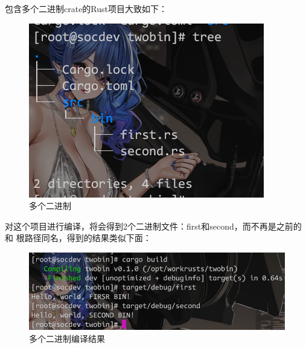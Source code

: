 包含多个二进制crate的Rust项目大致如下：
\begin{figure}[H]
  \centering
  \includegraphics[scale=0.5]{rust_more_bin.png}
  \caption{多个二进制}
  \label{fig:rust_more_bin}
\end{figure}
对这个项目进行编译，将会得到2个二进制文件：first和second，而不再是之前的和
根路径同名，得到的结果类似下面：
\begin{figure}[H]
  \centering
  \includegraphics[width=\linewidth]{rust_more_bin_res.png}
  \caption{多个二进制编译结果}
  \label{fig:rust_more_bin_res}
\end{figure}

